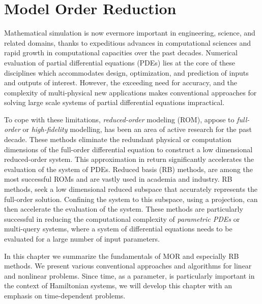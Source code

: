 \chapter{Model Order Reduction} \label{chapter:3}
Mathematical simulation is now evermore important in engineering, science, and related domains, thanks to expeditious advances in computational sciences and rapid growth in computational capacities over the past decades. Numerical evaluation of partial differential equations (PDEs) lies at the core of these disciplines which accommodates design, optimization, and prediction of inputs and outputs of interest. However, the exceeding need for accuracy, and the complexity of multi-physical new applications makes conventional approaches for solving large scale systems of partial differential equations impractical. 

To cope with these limitations, \emph{reduced-order} modeling (ROM), appose to \emph{full-order} or \emph{high-fidelity} modelling, has been an area of active research for the past decade. These methods eliminate the redundant physical or computation dimensions of the full-order differential equation to construct a low dimensional reduced-order system. This approximation in return significantly accelerates the evaluation of the system of PDEs. Reduced basis (RB) methods, are among the most successful ROMs and are vastly used in academia and industry. RB methods, seek a low dimensional reduced subspace that accurately represents the full-order solution. Confining the system to this subspace, using a projection, can then accelerate the evaluation of the system. These methods are particularly successful in reducing the computational complexity of \emph{parametric PDEs} or multi-query systems, where a system of differential equations needs to be evaluated for a large number of input parameters.

In this chapter we summarize the fundamentals of MOR and especially RB methods. We present various conventional approaches and algorithms for linear and nonlinear problems. Since time, as a parameter, is particularly important in the context of Hamiltonian systems, we will develop this chapter with an emphasis on time-dependent problems.

